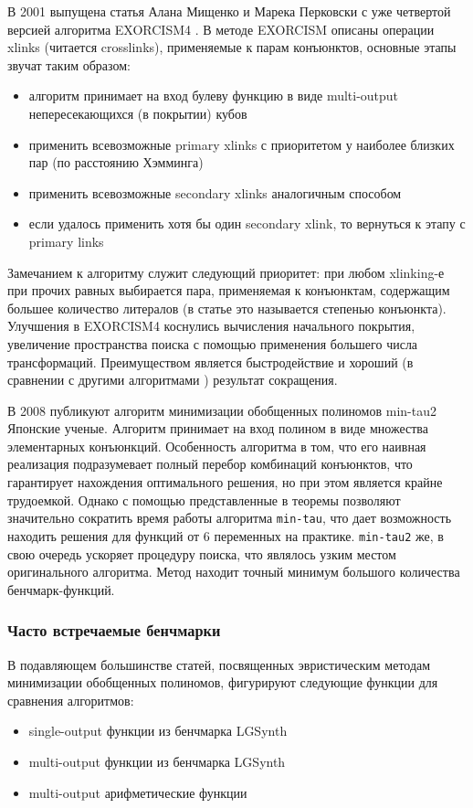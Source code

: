 \documentclass[a4paper,12pt,titlepage,finall]{article}
\begin{document}
В 2001 выпущена статья Алана Мищенко и Марека Перковски с уже четвертой версией алгоритма \textsc{EXORCISM4} \cite{exorcism4}. В методе \textsc{EXORCISM} описаны операции xlinks (читается crosslinks), применяемые к парам конъюнктов, основные этапы звучат таким образом:
\begin{itemize}
    \item алгоритм принимает на вход булеву функцию в виде multi-output непересекающихся (в покрытии) кубов
    \item применить всевозможные primary xlinks с приоритетом у наиболее близких пар (по расстоянию Хэмминга)
    \item применить всевозможные secondary xlinks аналогичным способом
    \item если удалось применить хотя бы один secondary xlink, то вернуться к этапу с primary links
\end{itemize}
Замечанием к алгоритму служит следующий приоритет: при любом xlinking-е при прочих равных выбирается пара, применяемая к конъюнктам, содержащим большее количество литералов (в статье это называется степенью конъюнкта). Улучшения в \textsc{EXORCISM4} коснулись вычисления начального покрытия, увеличение пространства поиска с помощью применения большего числа трансформаций. Преимуществом является быстродействие и хороший (в сравнении с другими алгоритмами \cite{exmin2} \cite{mint}) результат сокращения.

В 2008 публикуют алгоритм минимизации обобщенных полиномов min-tau2 \cite{min-tau2} Японские ученые.
Алгоритм принимает на вход полином в виде множества элементарных конъюнкций. Особенность алгоритма в том, что его наивная реализация подразумевает полный перебор комбинаций конъюнктов, что гарантирует нахождения оптимального решения, но при этом является крайне трудоемкой. Однако с помощью представленные в \cite{min-tau} теоремы позволяют значительно сократить время работы алгоритма \texttt{min-tau}, что дает возможность находить решения для функций от 6 переменных на практике. \texttt{min-tau2} же, в свою очередь ускоряет процедуру поиска, что являлось узким местом оригинального алгоритма. Метод находит точный минимум большого количества бенчмарк-функций.

\subsubsection{Часто встречаемые бенчмарки}

В подавляющем большинстве статей, посвященных эвристическим методам минимизации обобщенных полиномов, фигурируют следующие функции для сравнения алгоритмов:
\begin{itemize}
    \item single-output функции из бенчмарка LGSynth
    \item multi-output функции из бенчмарка LGSynth
    \item multi-output арифметические функции
\end{itemize}
\end{document}
